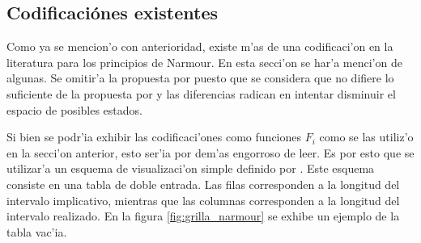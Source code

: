 \begin{imagen}
    \width{10cm}
\end{imagen}

\begin{imagen}
    \width{10cm}
\end{imagen}

\begin{imagen}
    \width{10cm}
\end{imagen}
\clearpage
\subsection{Codificaci\'ones existentes}
Como ya se mencion'o con anterioridad, existe m'as de una codificaci'on en la literatura para los principios de Narmour. 
En esta secci'on se har'a menci'on de algunas. Se omitir'a la propuesta por \cite{PaieThesis}
puesto que se considera que no difiere lo suficiente de la propuesta por \cite{Schellenberg97} y las diferencias radican en intentar disminuir
el espacio de posibles estados.


Si bien se podr'ia exhibir las codificaci'ones como funciones $F_i$ como se las utiliz'o en la secci'on anterior, esto ser'ia por dem'as engorroso de leer.
Es por esto que se utilizar'a un esquema de visualizaci'on simple definido por \cite{Narmour91}. Este esquema consiste en una tabla de doble entrada. 
Las filas corresponden a la longitud del intervalo implicativo, mientras que las columnas corresponden a la longitud del intervalo realizado.
En la figura \ref{fig:grilla_narmour} se exhibe un ejemplo de la tabla vac'ia.

\begin{imagen}
    \width{14cm}
\end{imagen}

